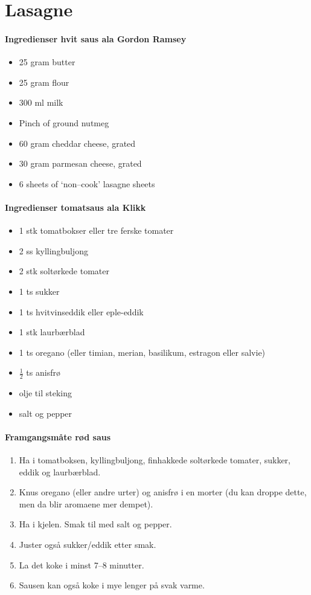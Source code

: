 \section{﻿Lasagne}


\paragraph{Ingredienser hvit saus ala Gordon Ramsey}
\begin{itemize}[noitemsep]
	\item 25 gram butter
	\item 25 gram flour
	\item 300 ml milk
	\item Pinch of ground nutmeg
	\item 60 gram cheddar cheese, grated
	\item 30 gram parmesan cheese, grated
	\item 6 sheets of `non--cook' lasagne sheets
\end{itemize}

\paragraph{Ingredienser tomatsaus ala Klikk}
\begin{itemize}[noitemsep]
	\item 1 stk tomatbokser eller tre ferske tomater
	\item 2 ss kyllingbuljong
	\item 2 stk soltørkede tomater
	\item 1 ts sukker
	\item 1 ts hvitvinseddik eller eple-eddik
	\item 1 stk laurbærblad
	\item 1 ts oregano (eller timian, merian, basilikum, estragon eller salvie)
	\item  $\frac{1}{2}$  ts anisfrø
	\item olje til steking
	\item salt og pepper
\end{itemize}

\paragraph{Framgangsmåte rød saus}
\begin{enumerate}[noitemsep]
	\item Ha i tomatboksen, kyllingbuljong, finhakkede soltørkede tomater, sukker, eddik og laurbærblad.
	\item Knus oregano (eller andre urter) og anisfrø i en morter (du kan droppe dette, men da blir aromaene mer dempet).
	\item Ha i kjelen. Smak til med salt og pepper.
	\item Juster også sukker/eddik etter smak.
	\item La det koke i minst 7--8 minutter.
	\item Sausen kan også koke i mye lenger på svak varme.
	\end{enumerate}

